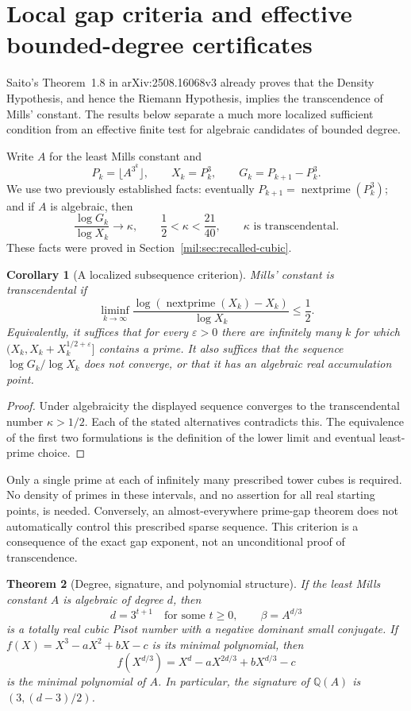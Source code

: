 \documentclass[11pt,a4paper]{article}
\newtheorem{theorem}{Theorem}[section]
\newtheorem{corollary}[theorem]{Corollary}
\theoremstyle{definition}
\theoremstyle{remark}
\numberwithin{equation}{section}
\begin{document}
\section{Local gap criteria and effective bounded-degree certificates}

Saito's Theorem~1.8 in arXiv:2508.16068v3 already proves that the
Density Hypothesis, and hence the Riemann Hypothesis, implies the
transcendence of Mills' constant. The results below separate a much
more localized sufficient condition from an effective finite test for
algebraic candidates of bounded degree.

Write $A$ for the least Mills constant and
\[
 P_k=\lfloor A^{3^k}\rfloor,\qquad X_k=P_k^3,
 \qquad G_k=P_{k+1}-P_k^3.
\]
We use two previously established facts: eventually
$P_{k+1}=\operatorname{nextprime}(P_k^3)$; and if $A$ is algebraic, then
\[
 \frac{\log G_k}{\log X_k}\longrightarrow\kappa,
 \qquad \frac12<\kappa<\frac{21}{40},
 \qquad \kappa\text{ is transcendental}.
\]
These facts were proved in Section~\ref{mil:sec:recalled-cubic}.

\begin{corollary}[A localized subsequence criterion]
Mills' constant is transcendental if
\[
 \liminf_{k\to\infty}
 \frac{\log(\operatorname{nextprime}(X_k)-X_k)}{\log X_k}
 \leq\frac12.
\]
Equivalently, it suffices that for every $\varepsilon>0$ there are
infinitely many $k$ for which $(X_k,X_k+X_k^{1/2+\varepsilon}]$
contains a prime. It also suffices that the sequence
$\log G_k/\log X_k$ does not converge, or that it has an algebraic
real accumulation point.
\end{corollary}

\begin{proof}
Under algebraicity the displayed sequence converges to the
transcendental number $\kappa>1/2$. Each of the stated alternatives
contradicts this. The equivalence of the first two formulations is the
definition of the lower limit and eventual least-prime choice.
\end{proof}

Only a single prime at each of infinitely many prescribed tower
cubes is required. No density of primes in these intervals, and no
assertion for all real starting points, is needed. Conversely, an
almost-everywhere prime-gap theorem does not automatically control
this prescribed sparse sequence. This criterion is a consequence of
the exact gap exponent, not an unconditional proof of transcendence.

\begin{theorem}[Degree, signature, and polynomial structure]\label{mil:thm:mills-degree-structure}
If the least Mills constant $A$ is algebraic of degree $d$, then
\[
 d=3^{t+1}\quad\text{for some }t\geq0,
 \qquad \beta=A^{d/3}
\]
is a totally real cubic Pisot number with a negative dominant small
conjugate. If $f(X)=X^3-aX^2+bX-c$ is its minimal polynomial, then
\[
 f(X^{d/3})=X^d-aX^{2d/3}+bX^{d/3}-c
\]
is the minimal polynomial of $A$. In particular, the signature of
$\mathbb Q(A)$ is $(3,(d-3)/2)$.
\end{theorem}
\end{document}
